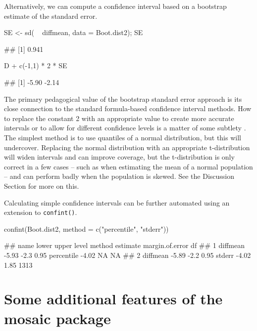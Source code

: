 Alternatively, we can compute a confidence interval based on a bootstrap
estimate of the standard error.

\begin{Schunk}
\begin{Sinput}
SE <- sd( ~ diffmean, data = Boot.dist2); SE
\end{Sinput}
\begin{Soutput}
## [1] 0.941
\end{Soutput}
\begin{Sinput}
D + c(-1,1) * 2 * SE
\end{Sinput}
\begin{Soutput}
## [1] -5.90 -2.14
\end{Soutput}
\end{Schunk}

\noindent
The primary pedagogical value of the bootstrap standard error approach
is its close connection to the standard formula-based confidence
interval methods. How to replace the constant 2 with an appropriate
value to create more accurate intervals or to allow for different
confidence levels is a matter of some subtlety \citep{Hesterberg:2015}.
The simplest method is to use quantiles of a normal distribution, but
this will undercover. Replacing the normal distribution with an
appropriate t-distribution will widen intervals and can improve
coverage, but the t-distribution is only correct in a few cases -- such
as when estimating the mean of a normal population -- and can perform
badly when the population is skewed. See the Discussion Section for more
on this.

Calculating simple confidence intervals can be further automated using
an extension to \texttt{confint()}.

\begin{Schunk}
\begin{Sinput}
confint(Boot.dist2, method = c("percentile", "stderr"))
\end{Sinput}
\begin{Soutput}
##       name lower upper level     method estimate margin.of.error   df
## 1 diffmean -5.93  -2.3  0.95 percentile    -4.02              NA   NA
## 2 diffmean -5.89  -2.2  0.95     stderr    -4.02            1.85 1313
\end{Soutput}
\end{Schunk}

\section{Some additional features of the mosaic
package}\label{some-additional-features-of-the-mosaic-package}

